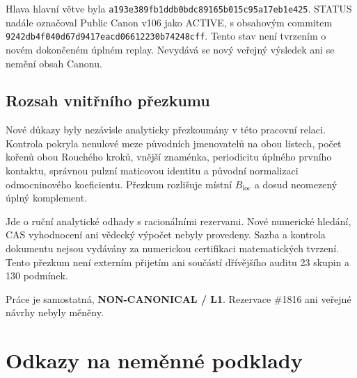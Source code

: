 \documentclass[11pt,a4paper]{article}
\theoremstyle{remark}\newtheorem{remark}[theorem]{Poznámka}
\numberwithin{equation}{section}
\begin{document}
Hlava hlavní větve byla
\nolinkurl{a193e389fb1ddb0bdc89165b015c95a17eb1e425}.
STATUS nadále označoval Public Canon v106 jako ACTIVE,
s obsahovým commitem
\nolinkurl{9242db4f040d67d9417eacd06612230b74248cff}.
Tento stav není tvrzením o novém dokončeném úplném
replay. Nevydává se nový veřejný výsledek ani se
nemění obsah Canonu.

\subsection{Rozsah vnitřního přezkumu}

Nové důkazy byly nezávisle analyticky přezkoumány
v této pracovní relaci. Kontrola pokryla nenulové
meze původních jmenovatelů na obou listech, počet
kořenů obou Rouchého kroků, vnější znaménka,
periodicitu úplného prvního kontaktu, správnou
pulzní maticovou identitu a původní normalizaci
odmocninového koeficientu. Přezkum rozlišuje místní
\(B_{\mathrm{loc}}\) a dosud neomezený úplný komplement.

Jde o ruční analytické odhady s racionálními rezervami.
Nové numerické hledání, CAS vyhodnocení ani vědecký
výpočet nebyly provedeny. Sazba a kontrola dokumentu
nejsou vydávány za numerickou certifikaci matematických
tvrzení. Tento přezkum není externím přijetím ani
součástí dřívějšího auditu 23 skupin a 130 podmínek.

Práce je samostatná, \textbf{NON-CANONICAL / L1}.
Rezervace \#1816 ani veřejné návrhy nebyly měněny.

\section*{Odkazy na neměnné podklady}
\end{document}
